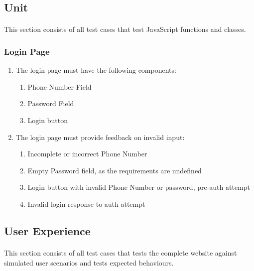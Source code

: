 \documentclass[12pt]{article}
\begin{document}
\subsection{Unit}
\paragraph{}	This section consists of all test cases that test JavaScript functions and classes.
\subsubsection{Login Page}
\begin{enumerate}	
	\item The login page must have the following components:
	\begin{enumerate}
		\singlespacing
		\item Phone Number Field
		\item Password Field
		\item Login button
	\end{enumerate}
	\item The login page must provide feedback on invalid input:
	\begin{enumerate}
		\singlespacing
		\item Incomplete or incorrect Phone Number
		\item Empty Password field, as the requirements are undefined
		\item Login button with invalid Phone Number or password, pre-auth attempt
		\item Invalid login response to auth attempt
	\end{enumerate}
\end{enumerate}	
\newpage
\subsection{User Experience} 
\paragraph{}	This section consists of all test cases that tests the complete website against simulated user scenarios and tests expected behaviours.
\end{document}
